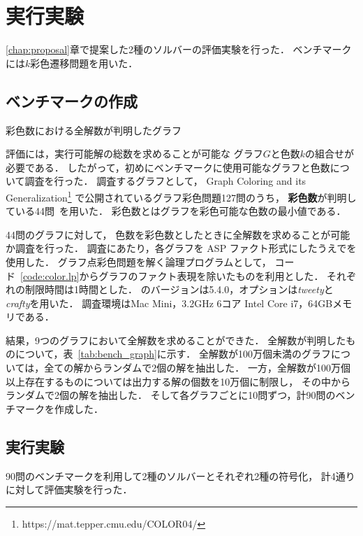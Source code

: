 \section{実行実験} \label{chap:experiment}
\ref{chap:proposal}章で提案した2種のソルバーの評価実験を行った．
ベンチマークには$k$彩色遷移問題を用いた．

\subsection{ベンチマークの作成}
\begin{table*}[t]
  \centering
  \caption{彩色数における全解数が判明したグラフ}
  \label{tab:bench_graph}
  
\end{table*}

評価には，実行可能解の総数を求めることが可能な
グラフ$G$と色数$k$の組合せが必要である．
したがって，初めにベンチマークに使用可能なグラフと色数について調査を行った．
調査するグラフとして，
Graph Coloring and its Generalization\footnote{https://mat.tepper.cmu.edu/COLOR04/}
で公開されているグラフ彩色問題127問のうち，
\textbf{彩色数}が判明している44問~\cite{DBLP:journals/constraints/TamuraTKB09}を用いた．
彩色数とはグラフを彩色可能な色数の最小値である．

44問のグラフに対して，
色数を彩色数としたときに全解数を求めることが可能か調査を行った．
調査にあたり，各グラフを ASP ファクト形式にしたうえで{\clingo}を使用した．
グラフ点彩色問題を解く論理プログラムとして，
コード~\ref{code:color.lp}からグラフのファクト表現を除いたものを利用とした．
それぞれの制限時間は1時間とした．
{\clingo}のバージョンは5.4.0，オプションは\textsl{tweety}と\textsl{crafty}を用いた．
調査環境はMac Mini，3.2GHz 6コア Intel Core i7，64GBメモリである．

結果，9つのグラフにおいて全解数を求めることができた．
全解数が判明したものについて，表~\ref{tab:bench_graph}に示す．
全解数が100万個未満のグラフについては，全ての解からランダムで2個の解を抽出した．
一方，全解数が100万個以上存在するものについては出力する解の個数を10万個に制限し，
その中からランダムで2個の解を抽出した．
そして各グラフごとに10問ずつ，計90問のベンチマークを作成した．

\subsection{実行実験}
90問のベンチマークを利用して2種のソルバーとそれぞれ2種の符号化，
計4通りに対して評価実験を行った．

